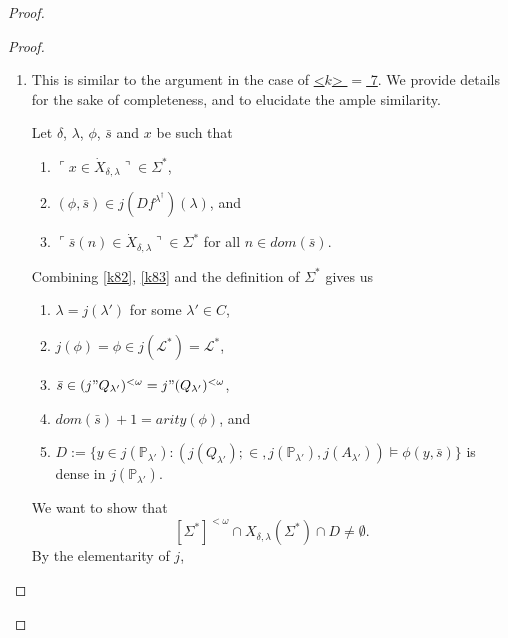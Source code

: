 \documentclass[12pt, twoside]{memoir}
\numberwithin{equation}{section}
\theoremstyle{definition}
\theoremstyle{remark}
\theoremstyle{definition}
\theoremstyle{definition}
\theoremstyle{definition}
\theoremstyle{remark}
\newcommand{\eq}{=}
\begin{document}
\begin{proof}
\begin{proof}
\begin{enumerate}[label=<$k$> $\eq$ \arabic* :, leftmargin=70pt]
\begin{enumerate}[label=Case \arabic*:, leftmargin=50pt]
\begin{align*}
        \end{align*}
        and
        \begin{align*}
            X_{\delta, \lambda}(\Sigma^*) \cap j(A_{\lambda'}) = j" (X_{\delta, \lambda'}(\bigcup g) \cap A_{\lambda'}),
        \end{align*}
        we can conclude $$(X_{\delta, \lambda}(\Sigma^*); \in, j(\mathbb{P}_{\lambda'}), j(A_{\lambda'})) \models \exists r \ \phi(r, \bar{s})$$ by invoking the elementarity of $j$ yet again.
    \end{enumerate}
    \item This is similar to the argument in the case of \hyperref[k7m]{<$k$> $\eq$ 7}. We provide details for the sake of completeness, and to elucidate the ample similarity. 
    
    Let $\delta$, $\lambda$, $\phi$, $\bar{s}$ and $x$ be such that 
    \begin{enumerate}[label=(K8.\arabic*), leftmargin=50pt]
        \item $\ulcorner x \in \dot{X}_{\delta, \lambda} \urcorner \in \Sigma^*$,
        \item\label{k82} $(\phi, \bar{s}) \in j(Df^{\lambda^{\dagger}})(\lambda)$, and
        \item\label{k83} $\ulcorner \bar{s}(n) \in \dot{X}_{\delta, \lambda} \urcorner \in \Sigma^*$ for all $n \in dom(\bar{s})$.
    \end{enumerate}
    Combining \ref{k82}, \ref{k83} and the definition of $\Sigma^*$ gives us 
    \begin{enumerate}[label=(\alph*)]
        \item $\lambda = j(\lambda')$ for some $\lambda' \in C$,
        \item $j(\phi) = \phi \in j(\mathcal{L}^*) = \mathcal{L}^*$,
        \item $\bar{s} \in (j" Q_{\lambda'})^{< \omega} = j" (Q_{\lambda'})^{< \omega}$,
        \item $dom(\bar{s}) + 1 = arity(\phi)$, and
        \item $D := \{y \in j(\mathbb{P}_{\lambda'}) : (j(Q_{\lambda'}); \in, j(\mathbb{P}_{\lambda'}), j(A_{\lambda'})) \models \phi(y, \bar{s})\}$ is dense in $j(\mathbb{P}_{\lambda'})$.
    \end{enumerate}
    We want to show that $$[\Sigma^*]^{< \omega} \cap X_{\delta, \lambda}(\Sigma^*) \cap D \neq \emptyset.$$ By the elementarity of $j$, 
    \begin{enumerate}[label=(\alph*)]
        \setcounter{enumii}{5}

\end{enumerate}
\end{enumerate}
\end{proof}
\end{proof}
\end{document}
